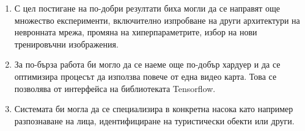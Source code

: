\begin{enumerate}
\item С цел постигане на по-добри резултати биха могли да се направят още множество експерименти, включително изпробване на други архитектури на невронната мрежа, промяна на хиперпараметрите, избор на нови тренировъчни изображения.
\item За по-бърза работа би могло да се наеме още по-добър хардуер и да се оптимизира процесът да използва повече от една видео карта. Това се позволява от интерфейса на библиотеката Tensorflow.
\item Системата би могла да се специализира в конкретна насока като например разпознаване на лица, идентифициране на туристически обекти или други.
\end{enumerate}
